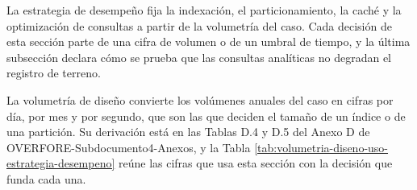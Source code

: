 \documentclass[subdoc]{../../comun/overfore}
\begin{document}
La estrategia de desempeño fija la indexación, el particionamiento, la caché y la optimización de consultas a partir de la volumetría del caso. Cada decisión de esta sección parte de una cifra de volumen o de un umbral de tiempo, y la última subsección declara cómo se prueba que las consultas analíticas no degradan el registro de terreno.

La volumetría de diseño convierte los volúmenes anuales del caso en cifras por día, por mes y por segundo, que son las que deciden el tamaño de un índice o de una partición. Su derivación está en las Tablas D.4 y D.5 del Anexo D de OVERFORE-Subdocumento4-Anexos, y la Tabla \ref{tab:volumetria-diseno-uso-estrategia-desempeno} reúne las cifras que usa esta sección con la decisión que funda cada una.
\end{document}
